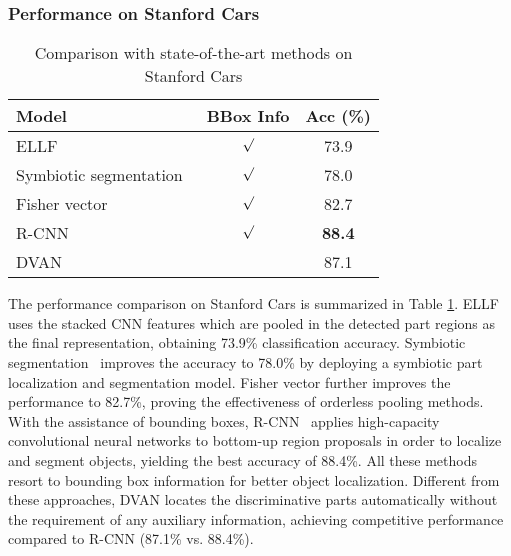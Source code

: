 \documentclass[journal]{IEEEtran}
\begin{document}
\subsubsection{Performance on Stanford Cars}
\begin{table}[!t]
  \centering
  \caption{Comparison with state-of-the-art methods on Stanford Cars}
  \vspace{-0.1in}  
  \label{tab:comparison_cars_2}
  \begin{tabular}{lcc}
    \hline\hline
    Model                   & BBox Info & Acc (\%)\\
    \hline
    ELLF~\cite{ellf}        & $\surd$ & 73.9\\
    Symbiotic segmentation~\cite{symbiotic_segmentation}& $\surd$ & 78.0\\
    Fisher vector~\cite{revisit_fv}    & $\surd$   & 82.7\\
    R-CNN~\cite{rich_feature}          & $\surd$   & \textbf{88.4}\\
    DVAN                               &           & 87.1\\
    \hline\hline
  \end{tabular}
  \vspace{-0.2in}
\end{table}
The performance comparison on Stanford Cars is summarized in Table \ref{tab:comparison_cars_2}. ELLF~\cite{ellf} uses the stacked CNN features which are pooled in the detected part regions as the final representation, obtaining 73.9\% classification accuracy. Symbiotic segmentation~\cite{symbiotic_segmentation} improves the accuracy to 78.0\% by deploying a symbiotic part localization and segmentation model. Fisher vector \cite{revisit_fv} further improves the performance to 82.7\%, proving the effectiveness of orderless pooling methods. With the assistance of bounding boxes, R-CNN~\cite{rich_feature} applies high-capacity convolutional neural networks to bottom-up region proposals in order to localize and segment objects, yielding the best accuracy of 88.4\%. All these methods resort to bounding box information for better object localization. Different from these approaches, DVAN locates the discriminative parts automatically without the requirement of any auxiliary information, achieving competitive performance compared to R-CNN (87.1\% vs. 88.4\%).


\end{document}
